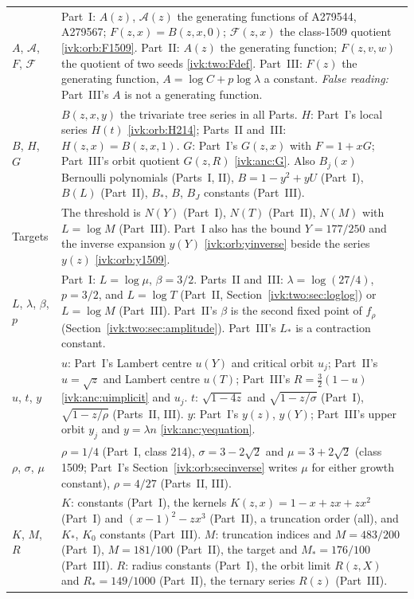 \documentclass[11pt,letterpaper]{article}
\theoremstyle{remark}\newtheorem{remark}[theorem]{Remark}
\begin{document}
\begin{longtable}{@{}>{\raggedright\arraybackslash}p{} >{\raggedright\arraybackslash}p{}@{}}
$A$, $\mathcal A$, $F$, $\mathcal F$ & Part~I: $A(z)$, $\mathcal A(z)$ the generating functions of A279544, A279567; $F(z,x)=B(z,x,0)$; $\mathcal F(z,x)$ the class-1509 quotient \eqref{ivk:orb:F1509}. Part~II: $A(z)$ the generating function; $F(z,v,w)$ the quotient of two seeds \eqref{ivk:two:Fdef}. Part~III: $F(z)$ the generating function, $A=\log C+p\log\lambda$ a constant. \emph{False reading:} Part~III's $A$ is not a generating function.\\
$B$, $H$, $G$ & $B(z,x,y)$ the trivariate tree series in all Parts. $H$: Part~I's local series $H(t)$ \eqref{ivk:orb:H214}; Parts~II and~III: $H(z,x)=B(z,x,1)$. $G$: Part~I's $G(z,x)$ with $F=1+xG$; Part~III's orbit quotient $G(z,R)$ \eqref{ivk:anc:G}. Also $B_j(x)$ Bernoulli polynomials (Parts~I, II), $B=1-y^2+yU$ (Part~I), $B(L)$ (Part~II), $B_*$, $B$, $B_J$ constants (Part~III).\\
Targets & The threshold is $N(Y)$ (Part~I), $N(T)$ (Part~II), $N(M)$ with $L=\log M$ (Part~III). Part~I also has the bound $Y=177/250$ and the inverse expansion $y(Y)$ \eqref{ivk:orb:yinverse} beside the series $y(z)$ \eqref{ivk:orb:y1509}.\\
$L$, $\lambda$, $\beta$, $p$ & Part~I: $L=\log\mu$, $\beta=3/2$. Parts~II and~III: $\lambda=\log(27/4)$, $p=3/2$, and $L=\log T$ (Part~II, Section~\ref{ivk:two:sec:loglog}) or $L=\log M$ (Part~III). Part~II's $\beta$ is the second fixed point of $f_\rho$ (Section~\ref{ivk:two:sec:amplitude}). Part~III's $L_*$ is a contraction constant.\\
$u$, $t$, $y$ & $u$: Part~I's Lambert centre $u(Y)$ and critical orbit $u_j$; Part~II's $u=\sqrt z$ and Lambert centre $u(T)$; Part~III's $R=\frac32(1-u)$ \eqref{ivk:anc:uimplicit} and $u_j$. $t$: $\sqrt{1-4z}$ and $\sqrt{1-z/\sigma}$ (Part~I), $\sqrt{1-z/\rho}$ (Parts~II, III). $y$: Part~I's $y(z)$, $y(Y)$; Part~III's upper orbit $y_j$ and $y=\lambda n$ \eqref{ivk:anc:yequation}.\\
$\rho$, $\sigma$, $\mu$ & $\rho=1/4$ (Part~I, class 214), $\sigma=3-2\sqrt2$ and $\mu=3+2\sqrt2$ (class 1509; Part~I's Section~\ref{ivk:orb:secinverse} writes $\mu$ for either growth constant), $\rho=4/27$ (Parts~II, III).\\
$K$, $M$, $R$ & $K$: constants (Part~I), the kernels $K(z,x)=1-x+zx+zx^2$ (Part~I) and $(x-1)^2-zx^3$ (Part~II), a truncation order (all), and $K_*$, $K_0$ constants (Part~III). $M$: truncation indices and $M=483/200$ (Part~I), $M=181/100$ (Part~II), the target and $M_*=176/100$ (Part~III). $R$: radius constants (Part~I), the orbit limit $R(z,X)$ and $R_*=149/1000$ (Part~II), the ternary series $R(z)$ (Part~III).\\

\end{longtable}
\end{document}

